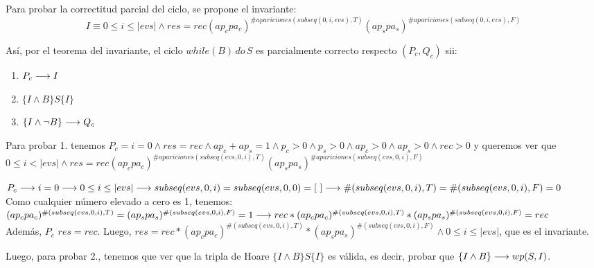 \documentclass[10pt,a4paper]{article}
\begin{document}
Para probar la correctitud parcial del ciclo, se propone el invariante:
\begin{equation*}
	I \equiv 0 \leq i \leq |evs| \wedge res = rec (ap_c pa_c)^{\# apariciones(subseq(0, i, evs), T)}(ap_s pa_s)^{\#apariciones(subseq(0, i, evs), F)}
\end{equation*}	

Así, por el teorema del invariante, el ciclo $while(B) \, do \, S$ es parcialmente correcto respecto $(P_c, Q_c) $ sii:

\begin{enumerate} \setlength\itemsep{0cm}
	\item $P_c \longrightarrow I$
	\item $\{I \wedge B \} S \{I\}$
	\item $\{I \wedge \neg B \} \longrightarrow Q_c$
\end{enumerate}

Para probar 1. tenemos $P_c = i=0 \wedge res=rec \wedge ap_c + ap_s = 1 \wedge p_c > 0 \wedge p_s > 0 \wedge ap_c > 0 \wedge ap_s > 0 \wedge rec > 0$ y queremos ver que \\ $0 \leq i < |evs| \wedge res = rec (ap_c pa_c)^{\# apariciones(subseq(evs, 0, i), T)}(ap_s pa_s)^{\#apariciones(subseq(evs, 0, i), F)}$

\begin{proof*}
    $P_c \longrightarrow  i = 0 \longrightarrow 0 \leq i \leq |evs| \\
    \longrightarrow subseq(evs, 0, i) = subseq(evs, 0, 0) = [\ ] \\
    \longrightarrow \#(subseq(evs, 0, i), T) = \#(subseq(evs, 0, i), F) = 0  $\\
    Como cualquier número elevado a cero es 1, tenemos: \\
    $(ap_c pa_c)^{\#(subseq(evs, 0, i), T)} = (ap_s pa_s)^{\#(subseq(evs, 0, i), F)} = 1 \\
	\longrightarrow rec * (ap_c pa_c)^{\#(subseq(evs, 0, i), T)} * (ap_s pa_s)^{\#(subseq(evs, 0, i), F)} = rec $\\
    Además, $P_c$ \implica $res = rec$. Luego, $res = rec * (ap_c pa_c)^{\#(subseq(evs, 0, i), T)} * (ap_s pa_s)^{\#(subseq(evs, 0, i), F)} \wedge 0 \leq i \leq |evs|$, que es el invariante.
\end{proof*}

Luego, para probar 2., tenemos que ver que la tripla de Hoare $\{I \wedge B \} S \{I\}$ es válida, es decir, probar que $\{I \wedge B \} \longrightarrow wp(S, I) $.\\
\end{document}
